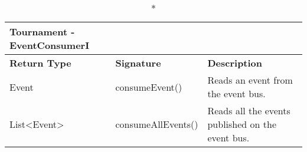 	\begin{longtable}{|p{2.5cm} p{6.5cm} p{4.5cm}|}
	\caption*{Tournament - EventConsumerI}\\ 
	
	\hline
	\textbf{Return Type} & \textbf{Signature} & \textbf{Description}\\
	\hline \endhead
	
	Event & consumeEvent()  & Reads an event from the event bus.\\
	
	List\textless Event\textgreater & consumeAllEvents() & Reads all the events published on the event bus.\\
	
	\hline
	
\end{longtable}

\pagebreak



